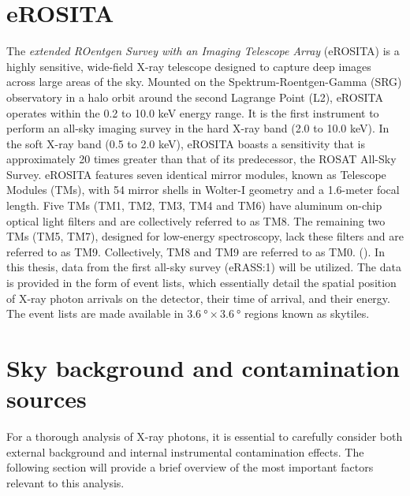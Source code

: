 \section{eROSITA}
The \textit{extended ROentgen Survey with an Imaging Telescope Array} (eROSITA) is a highly sensitive, wide-field X-ray telescope designed to capture deep images across large areas of the sky. Mounted on the Spektrum-Roentgen-Gamma (SRG) observatory in a halo orbit around the second Lagrange Point (L2), eROSITA operates within the 0.2 to 10.0 keV energy range. It is the first instrument to perform an all-sky imaging survey in the hard X-ray band (2.0 to 10.0 keV). In the soft X-ray band (0.5 to 2.0 keV), eROSITA boasts a sensitivity that is approximately 20 times greater than that of its predecessor, the ROSAT All-Sky Survey. eROSITA features seven identical mirror modules, known as Telescope Modules (TMs), with 54 mirror shells in Wolter-I geometry and a 1.6-meter focal length. Five TMs (TM1, TM2, TM3, TM4 and TM6) have aluminum on-chip optical light filters and are collectively referred to as TM8. The remaining two TMs (TM5, TM7), designed for low-energy spectroscopy, lack these filters and are referred to as TM9. Collectively, TM8 and TM9 are referred to as TM0. (\cite{Predehl2021}). In this thesis, data from the first all-sky survey (eRASS:1) will be utilized. The data is provided in the form of event lists, which essentially detail the spatial position of X-ray photon arrivals on the detector, their time of arrival, and their energy. The event lists are made available in \(\SI{3.6}{\degree}\times\SI{3.6}{\degree}\) regions known as skytiles.
\section{Sky background and contamination sources}\label{sec:background}
For a thorough analysis of X-ray photons, it is essential to carefully consider both external background and internal instrumental contamination effects. The following section will provide a brief overview of the most important factors relevant to this analysis.
